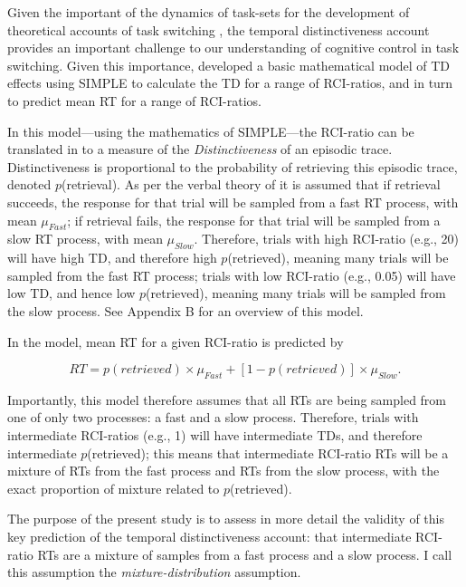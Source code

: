 \documentclass[a4paper, man, natbib]{apa6}
\begin{document}
Given the important of the dynamics of task-sets for the development of theoretical accounts of task switching \citep[e.g.,][]{Altmann2008, Schneider2005}, the temporal distinctiveness account provides an important challenge to our understanding of cognitive control in task switching. Given this importance, \cite{Grange2015} developed a basic mathematical model of TD effects using SIMPLE \citep{Brown2007} to calculate the TD for a range of RCI-ratios, and in turn to predict mean RT for a range of RCI-ratios. 

In this model---using the mathematics of SIMPLE---the RCI-ratio can be translated in to a measure of the \emph{Distinctiveness} of an episodic trace. Distinctiveness is proportional to the probability of retrieving this episodic trace, denoted $p$(retrieval). As per the verbal theory of \cite{Horoufchin2011a} it is assumed that if retrieval succeeds, the response for that trial will be sampled from a fast RT process, with mean $\mu_{Fast}$; if retrieval fails, the response for that trial will be sampled from a slow RT process, with mean $\mu_{Slow}$. Therefore, trials with high RCI-ratio (e.g., 20) will have high TD, and therefore high $p$(retrieved), meaning many trials will be sampled from the fast RT process; trials with low RCI-ratio (e.g., 0.05) will have low TD, and hence low $p$(retrieved), meaning many trials will be sampled from the slow process. See Appendix B for an overview of this model.  

In the model, mean RT for a given RCI-ratio is predicted by

\begin{equation}
RT = p(retrieved) \times \mu_{Fast} + [1 - p(retrieved)] \times \mu_{Slow}.
\label{eq:simpleMixture}
\end{equation}

Importantly, this model therefore assumes that all RTs are being sampled from one of only two processes: a fast and a slow process. Therefore, trials with intermediate RCI-ratios (e.g., 1) will have intermediate TDs, and therefore intermediate $p$(retrieved); this means that intermediate RCI-ratio RTs will be a mixture of RTs from the fast process and RTs from the slow process, with the exact proportion of mixture related to $p$(retrieved). 
    
The purpose of the present study is to assess in more detail the validity of this key prediction of the temporal distinctiveness account: that intermediate RCI-ratio RTs are a mixture of samples from a fast process and a slow process. I call this assumption the \emph{mixture-distribution} assumption. 
\end{document}
